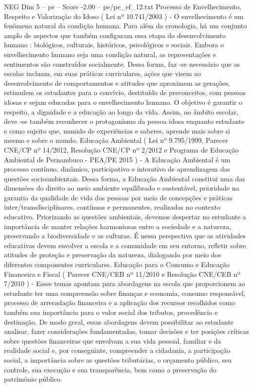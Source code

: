 \begin{textsample}{NEG Dim 5 – pe – Score -2.00 – pe/pe\_ef\_12.txt}
Processo de Envelhecimento, Respeito e Valorização do Idoso ( Lei nº 10.741/2003 ) - O envelhecimento é um fenômeno natural da condição humana.
Para além da cronologia, há um conjunto amplo de aspectos que também configuram essa etapa do desenvolvimento humano : biológicos, culturais, históricos, psicológicos e sociais.
Embora o envelhecimento humano seja uma condição natural, as representações e sentimentos são construídos socialmente.
Dessa forma, faz -se necessário que as escolas incluam, em suas práticas curriculares, ações que visem ao desenvolvimento de comportamentos e atitudes que aproximem as gerações, estimulem os estudantes para o convívio, destituído de preconceitos, com pessoas idosas e sejam educadas para o envelhecimento humano.
O objetivo é garantir o respeito, a dignidade e a educação ao longo da vida.
Assim, no âmbito escolar, deve -se também reconhecer o protagonismo da pessoa idosa enquanto estudante e como sujeito que, munido de experiências e saberes, aprende mais sobre si mesmo e sobre o mundo.
Educação Ambiental ( Lei nº 9.795/1999, Parecer CNE/CP nº 14/2012, Resolução CNE/CP nº 2/2012 e Programa de Educação Ambiental de Pernambuco - PEA/PE 2015 ) - A Educação Ambiental é um processo contínuo, dinâmico, participativo e interativo de aprendizagem das questões socioambientais.
Dessa forma, a Educação Ambiental constitui uma das dimensões do direito ao meio ambiente equilibrado e sustentável, prioridade na garantia da qualidade de vida das pessoas por meio de concepções e práticas inter/transdisciplinares, contínuas e permanentes, realizadas no contexto educativo.
Priorizando as questões ambientais, devemos despertar no estudante a importância de manter relações harmoniosas entre a sociedade e a natureza, preservando a biodiversidade e as culturas.
É nessa perspectiva que as atividades educativas devem envolver a escola e a comunidade em seu entorno, refletir sobre atitudes de proteção e preservação da natureza, dialogando por meio dos diferentes componentes curriculares.
Educação para o Consumo e Educação Financeira e Fiscal ( Parecer CNE/CEB nº 11/2010 e Resolução CNE/CEB nº 7/2010 ) - Esses temas apontam para abordagens na escola que proporcionem ao estudante ter uma compreensão sobre finanças e economia, consumo responsável, processo de arrecadação financeira e a aplicação dos recursos recolhidos como também sua importância para o valor social dos tributos, procedência e destinação.
De modo geral, essas abordagens devem possibilitar ao estudante analisar, fazer considerações fundamentadas, tomar decisões e ter posições críticas sobre questões financeiras que envolvam a sua vida pessoal, familiar e da realidade social e, por conseguinte, compreender a cidadania, a participação social, a importância sobre as questões tributárias, o orçamento público, seu controle, sua execução e sua transparência, bem como a preservação do patrimônio público.

\end{textsample}
